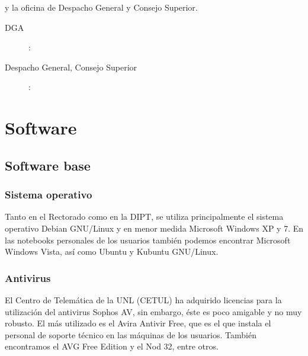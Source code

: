 \documentclass[a4paper,11pt,oneside]{article}
\begin{document}
\begin{description}
    y la oficina de Despacho General y Consejo Superior.
    \begin{description}
      \item[DGA]:
      \newpage
      \item[Despacho General, Consejo Superior]:
    \end{description}
\end{description}
%
\section{Software}
%
\subsection{Software base}
%
\subsubsection*{Sistema operativo}
Tanto en el Rectorado como en la DIPT, se utiliza principalmente el
sistema operativo Debian GNU/Linux y en menor medida Microsoft Windows
XP y 7. En las notebooks personales de los usuarios también podemos
encontrar Microsoft Windows Vista, así como Ubuntu y Kubuntu
GNU/Linux.
%
\subsubsection*{Antivirus}
El Centro de Telemática de la UNL (CETUL) ha adquirido licencias para
la utilización del antivirus Sophos AV, sin embargo, éste es poco
amigable y no muy robusto. El más utilizado es el Avira Antivir Free,
que es el que instala el personal de soporte técnico en las máquinas
de los usuarios. También encontramos el AVG Free Edition y el Nod 32,
entre otros.
%
\end{document}
